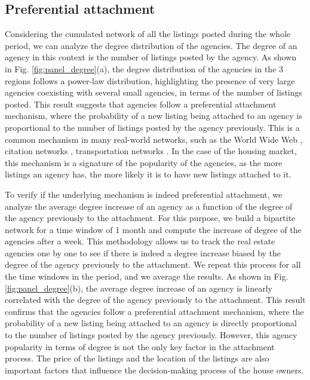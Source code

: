 \subsection{Preferential attachment}

Considering the cumulated network of all the listings posted during the whole period, we can analyze the degree distribution of the agencies. The degree of an agency in this context is the number of listings posted by the agency. As shown in Fig. \ref{fig:panel_degree}(a), the degree distribution of the agencies in the 3 regions follows a power-law distribution, highlighting the presence of very large agencies coexisting with several small agencies, in terms of the number of listings posted. This result suggests that agencies follow a preferential attachment mechanism, where the probability of a new listing being attached to an agency is proportional to the number of listings posted by the agency previously. This is a common mechanism in many real-world networks, such as the World Wide Web \cite{barabasi1999emergence}, citation networks \cite{redner1998popular}, transportation networks \cite{barrat2004architecture}. In the case of the housing market, this mechanism is a signature of the popularity of the agencies, as the more listings an agency has, the more likely it is to have new listings attached to it.

To verify if the underlying mechanism is indeed preferential attachment, we analyze the average degree increase of an agency as a function of the degree of the agency previously to the attachment. For this purpose, we build a bipartite network for a time window of 1 month and compute the increase of degree of the agencies after a week. This methodology allows us to track the real estate agencies one by one to see if there is indeed a degree increase biased by the degree of the agency previously to the attachment. We repeat this process for all the time windows in the period, and we average the results. As shown in Fig. \ref{fig:panel_degree}(b), the average degree increase of an agency is linearly correlated with the degree of the agency previously to the attachment. This result confirms that the agencies follow a preferential attachment mechanism, where the probability of a new listing being attached to an agency is directly proportional to the number of listings posted by the agency previously. However, this agency popularity in terms of degree is not the only key factor in the attachment process. The price of the listings and the location of the listings are also important factors that influence the decision-making process of the house owners.

